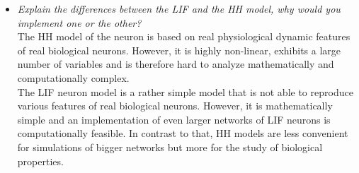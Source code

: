 \documentclass[
a4paper, 
12pt, 
]{article}
\begin{document}
\begin{itemize}
	
	
	\item \textit{Explain the differences between the LIF and the HH model, why would you implement one or the other?}\\
	The HH model of the neuron is based on real physiological dynamic features of real biological neurons. However, it is highly non-linear, exhibits a large number of variables and is therefore hard to analyze mathematically and computationally complex.\\
	The LIF neuron model is a rather simple model that is not able to reproduce various features of real biological neurons. However, it is mathematically simple and an implementation of even larger networks of LIF neurons is computationally feasible. In contrast to that, HH models are less convenient for simulations of bigger networks but more for the study of biological properties. 
	
\end{itemize}



	
	
	
\end{document}
